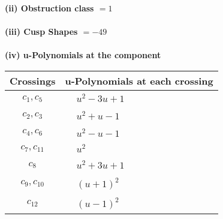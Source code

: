 \documentclass[1p]{elsarticle_modified}
\theoremstyle{definition}
\begin{document}
\flushleft \textbf{(ii) Obstruction class $= 1$}\\~\\
\flushleft \textbf{(iii) Cusp Shapes $= -49$}\\~\\
\newpage\renewcommand{\arraystretch}{1}
\flushleft \textbf{(iv) u-Polynomials at the component}\newline \\
\begin{tabular}{m{50pt}|m{274pt}}
Crossings & \hspace{64pt}u-Polynomials at each crossing \\
\hline $$\begin{aligned}c_{1},c_{5}\end{aligned}$$&$\begin{aligned}
&u^2-3 u+1
\end{aligned}$\\
\hline $$\begin{aligned}c_{2},c_{3}\end{aligned}$$&$\begin{aligned}
&u^2+u-1
\end{aligned}$\\
\hline $$\begin{aligned}c_{4},c_{6}\end{aligned}$$&$\begin{aligned}
&u^2- u-1
\end{aligned}$\\
\hline $$\begin{aligned}c_{7},c_{11}\end{aligned}$$&$\begin{aligned}
&u^2
\end{aligned}$\\
\hline $$\begin{aligned}c_{8}\end{aligned}$$&$\begin{aligned}
&u^2+3 u+1
\end{aligned}$\\
\hline $$\begin{aligned}c_{9},c_{10}\end{aligned}$$&$\begin{aligned}
&(u+1)^2
\end{aligned}$\\
\hline $$\begin{aligned}c_{12}\end{aligned}$$&$\begin{aligned}
&(u-1)^2
\end{aligned}$\\
\hline
\end{tabular}\\~\\
\end{document}
